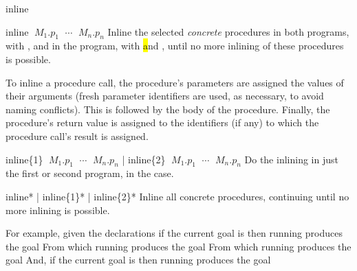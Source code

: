 \begin{tactic}{inline}
  \begin{tsyntax}{inline $\;M_1$.$p_1$ $\;\cdots$ $\;M_n$.$p_n$}
    Inline the selected \emph{concrete} procedures in both programs,
    with \prhl, and in the program, with \hl and \phl, until no more
    inlining of these procedures is possible.

    To inline a procedure call, the procedure's parameters are
    assigned the values of their arguments (fresh parameter
    identifiers are used, as necessary, to avoid naming
    conflicts). This is followed by the body of the procedure. Finally,
    the procedure's return value is assigned to the identifiers (if
    any) to which the procedure call's result is assigned.
  \end{tsyntax}

  \begin{tsyntax}{inline\{1\} $\;M_1$.$p_1$ $\;\cdots$ $\;M_n$.$p_n$ | inline\{2\} $\;M_1$.$p_1$ $\;\cdots$ $\;M_n$.$p_n$}
    Do the inlining in just the first or second program, in the \prhl case.
  \end{tsyntax}

  \begin{tsyntax}{inline* | inline\{1\}* | inline\{2\}*}
    Inline all concrete procedures, continuing until no more inlining
    is possible.
  \end{tsyntax}

  \bigskip
  For example, given the declarations
  if the current goal is
   then
  running 
  produces the goal
  From which running
  produces the goal
  From which running
  produces the goal
  And, if the current goal is
   then
  running 
  produces the goal
\end{tactic}
